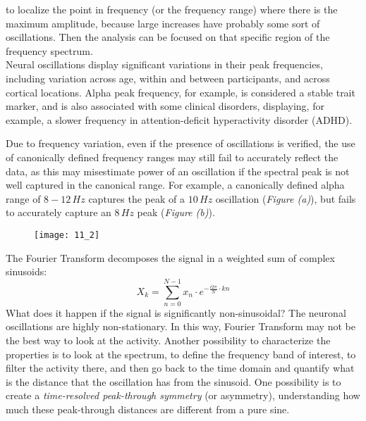 to localize the point in frequency (or the frequency range) where there is the maximum amplitude, because large increases have probably some sort of oscillations. 
Then the analysis can be focused on that specific region of the frequency spectrum.\\
Neural oscillations display significant variations in their peak frequencies, including variation across age, within and between participants, 
and across cortical locations. Alpha peak frequency, for example, is considered a stable trait marker, and is also associated with some clinical disorders, displaying, 
for example, a slower frequency in attention-deficit hyperactivity disorder (ADHD). 
\par\medskip 
Due to frequency variation, even if the presence of oscillations is verified, the use of canonically defined frequency ranges may still fail to accurately reflect the 
data, as this may misestimate power of an oscillation if the spectral peak is not well captured in the canonical range. For example, a canonically defined alpha range 
of \(8-12\,Hz\) captures the peak of a \(10\,Hz\) oscillation (\textit{Figure (a)}), but fails to accurately capture an \(8\,Hz\) peak (\textit{Figure (b)}).
\begin{figure}[H]
    \texttt{[image: 11\_2]}
    \centering
\end{figure}
The Fourier Transform decomposes the signal in a weighted sum of complex sinusoids:
\begin{equation*}
    X_k=\sum_{n=0}^{N-1} x_n\cdot e^{-\frac{i2\pi}{N}\cdot kn}
\end{equation*}
What does it happen if the signal is significantly non-sinusoidal? The neuronal oscillations are highly non-stationary. In this way, Fourier Transform may not 
be the best way to look at the activity. Another possibility to characterize the properties is to look at the spectrum, to define the frequency band of interest, to filter 
the activity there, and then go back to the time domain and quantify what is the distance that the oscillation has from the sinusoid. One possibility is to create a \textit{time-resolved 
peak-through symmetry} (or asymmetry), understanding how much these peak-through distances are different from a pure sine.

